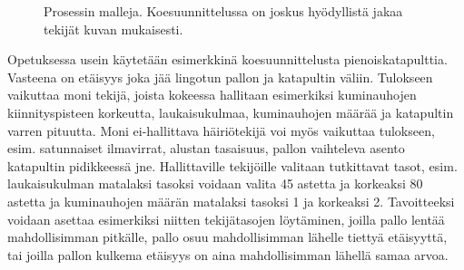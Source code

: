 \documentclass[12pt,a4paper,finnish]{tutthesis}
\begin{document}
\begin{figure}
  \begin{center}

    \caption[Prosessin malleja]{Prosessin malleja. Koesuunnittelussa on joskus
    hyödyllistä jakaa tekijät kuvan mukaisesti.}

    \label{fig:prosessi1}
  \end{center}
\end{figure}





Opetuksessa usein käytetään esimerkkinä koesuunnittelusta pienoiskatapulttia.
Vasteena on etäisyys joka jää lingotun pallon ja katapultin väliin. Tulokseen
vaikuttaa moni tekijä, joista kokeessa hallitaan esimerkiksi kuminauhojen
kiinnityspisteen korkeutta, laukaisukulmaa, kuminauhojen määrää ja katapultin
varren pituutta. Moni ei-hallittava häiriötekijä
voi myös vaikuttaa tulokseen, esim. satunnaiset ilmavirrat, alustan tasaisuus,
pallon vaihteleva asento katapultin pidikkeessä jne. Hallittaville tekijöille
valitaan tutkittavat tasot, esim. laukaisukulman matalaksi tasoksi voidaan
valita 45 astetta ja korkeaksi 80 astetta ja kuminauhojen määrän matalaksi
tasoksi 1 ja korkeaksi 2. Tavoitteeksi voidaan asettaa esimerkiksi niitten
tekijätasojen löytäminen, joilla pallo lentää mahdollisimman pitkälle,
pallo osuu mahdollisimman lähelle tiettyä etäisyyttä, tai joilla
pallon kulkema etäisyys on aina mahdollisimman lähellä samaa arvoa.
\end{document}
